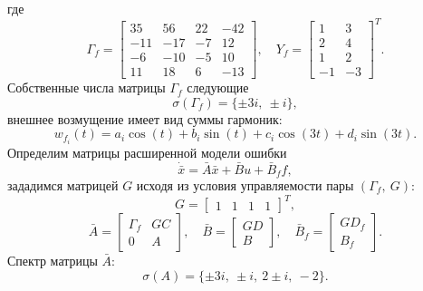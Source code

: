 где
\begin{equation*}
    \Gamma_f=\begin{bmatrix}
        35& 56& 22& -42\\
        -11& -17& -7& 12\\
        -6& -10& -5& 10\\
        11 &18& 6& -13
    \end{bmatrix},\quad
    Y_f=\begin{bmatrix}
        1&3\\2&4\\1&2\\-1&-3
    \end{bmatrix}^T.
\end{equation*}
Собственные числа матрицы $\Gamma_f$ следующие
\begin{equation}
    \label{eq:specGf}
    \sigma(\Gamma_f)=\{\pm3i,\ \pm i\},
\end{equation}
внешнее возмущение имеет вид суммы гармоник:
\begin{equation*}
    w_{f_i}(t)=a_i\cos(t)+b_i\sin(t) + c_i\cos(3t)+d_i\sin(3t).
\end{equation*}
Определим матрицы расширенной модели ошибки
\begin{equation*}
    \dot{\bar x}=\bar A\bar x+\bar Bu+\bar B_ff,
\end{equation*}
зададимся матрицей $G$ исходя из условия управляемости пары $(\Gamma_f,\ G)$:
\begin{equation*}
    G=\begin{bmatrix}
        1&1&1&1
    \end{bmatrix}^T,
\end{equation*}
\begin{equation*}
    \bar A=\begin{bmatrix}
        \Gamma_f &GC\\ 0& A
    \end{bmatrix},\quad
    \bar B = \begin{bmatrix}
        GD\\ B
    \end{bmatrix},\quad
    \bar B_f=\begin{bmatrix}
        GD_f\\B_f
    \end{bmatrix}.
\end{equation*}
Спектр матрицы $\bar A$:
\begin{equation*}
    \sigma(A)=\{\pm 3i,\ 
    \pm i,\ 
    2 \pm i,\ 
    -2\}.
\end{equation*}


